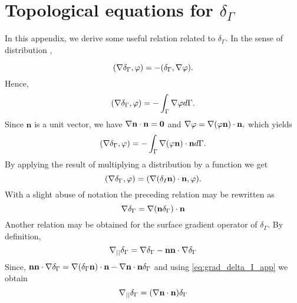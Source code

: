 \section{Topological equations for $\delta_\Gamma$}
\label{ap:delta_I}
In this appendix, we derive some useful relation related to $\delta_\Gamma$. In the sense of distribution \citep{appel2007}, 

\begin{equation}
(\mathbf{\nabla} \delta_\Gamma,\varphi) = - (\delta_\Gamma,\mathbf{\nabla} \varphi).
\end{equation}
Hence,
\begin{equation}
(\grad \delta_\Gamma,\varphi) = - \int_{\Gamma} \grad \varphi d\Gamma.
\label{eq:1grad_delta_I}
\end{equation}
Since $\textbf{n}$ is a unit vector, we have $\mathbf{\nabla}  \textbf{n} \cdot \textbf{n} =\bm 0$ and%
$\mathbf{\nabla} \varphi= \mathbf{\nabla}  (\varphi \textbf{n}) \cdot \textbf{n},$
which yields 
\begin{equation}
(\mathbf{\nabla} \delta_\Gamma,\varphi) = - \int_{\Gamma} \mathbf{\nabla}  (\varphi \textbf{n}) \cdot \textbf{n} d\Gamma. 
\end{equation}
By applying the result of multiplying a distribution by a function we get \citep{appel2007} %
\begin{equation}
(\mathbf{\nabla} \delta_\Gamma,\varphi) = (\mathbf{\nabla}  (\delta _I \textbf{n}) \cdot \textbf{n},\varphi).
\end{equation}
With a slight abuse of notation the preceding relation may be rewritten as
\begin{equation}
    \grad\delta_\Gamma 
    =   \grad  (\textbf{n} \delta_\Gamma) \cdot \textbf{n}
    \label{eq:grad_delta_I_app}
\end{equation}
Another relation may be obtained for the surface gradient operator of $\delta_\Gamma$. By definition,
\begin{equation}
  \mathbf{\nabla}_{||} \delta_\Gamma  = \mathbf{\nabla}\delta_\Gamma - \textbf{nn}\cdot\mathbf{\nabla}\delta_\Gamma
\end{equation}
Since, $\textbf{nn}\cdot\mathbf{\nabla}\delta_\Gamma = \mathbf{\nabla}  (\delta_\Gamma\textbf{n})\cdot \textbf{n}-\mathbf{\nabla} \textbf{n}\cdot \textbf{n} \delta_\Gamma$ and using \ref{eq:grad_delta_I_app} we obtain
\begin{equation}
  \gradI \delta_\Gamma  = (\grad \textbf{n}\cdot \textbf{n}) \delta_\Gamma
\label{eq:gradI_deltaI}
\end{equation}


